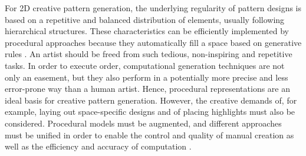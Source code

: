 

For 2D creative pattern generation, the underlying regularity of pattern designs is based on a repetitive and balanced distribution of elements, usually following hierarchical structures. These characteristics can be efficiently implemented by procedural approaches because they automatically fill a space based on generative rules \cite{stava_2010_ipm}. An artist should be freed from such tedious, non-inspiring and repetitive tasks. In order to execute order, computational generation techniques are not only an easement, but they also perform in a potentially more precise and less error-prone way than a human artist. Hence, procedural representations are an ideal basis for creative pattern generation. 
However, the creative demands of, for example, laying out space-specific designs and of placing highlights must also be considered. Procedural models must be augmented, and different approaches must be unified in order to enable the control and quality of manual creation as well as the efficiency and accuracy of computation \cite{gieseke_2017_ooo}. 

